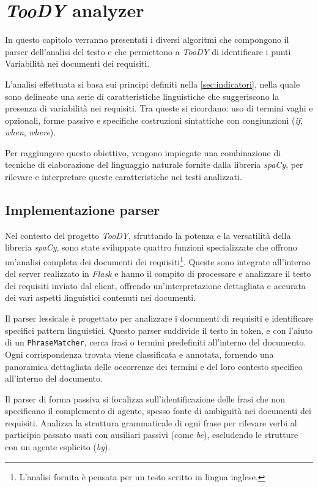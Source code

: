 \documentclass[12pt]{report}
\newcommand{\toody}{\textsl{TooDY}\xspace}
\newcommand{\flask}{\textsl{Flask}\xspace}
\newcommand{\spacy}{\textsl{spaCy}\xspace}
\begin{document}
\clearpage\thispagestyle{empty}
\null\newpage




\chapter{\toody analyzer}
\label{ch:parser}
In questo capitolo verranno presentati i diversi algoritmi che compongono il parser dell'analisi del testo e che permettono a \toody di identificare i punti Variabilità nei documenti dei requisiti.

L'analisi effettuata si basa sui principi definiti nella \cref{sec:indicatori}, nella quale sono delineate una serie di caratteristiche linguistiche che suggeriscono la presenza di variabilità nei requisiti. Tra queste si ricordano: uso di termini vaghi e opzionali, forme passive e specifiche costruzioni sintattiche con congiunzioni (\textit{if}, \textit{when}, \textit{where}).

Per raggiungere questo obiettivo, vengono impiegate una combinazione di tecniche di elaborazione del linguaggio naturale fornite dalla libreria \spacy, per rilevare e interpretare queste caratteristiche nei testi analizzati.


\section{Implementazione parser}
Nel contesto del progetto \toody, sfruttando la potenza e la versatilità della libreria \spacy, sono state sviluppate quattro funzioni specializzate che offrono un'analisi completa dei documenti dei requisiti\footnote{L'analisi fornita è pensata per un testo scritto in lingua inglese.}. Queste sono integrate all'interno del server realizzato in \flask e hanno il compito di processare e analizzare il testo dei requisiti inviato dal client, offrendo un'interpretazione dettagliata e accurata dei vari aspetti linguistici contenuti nei documenti.

Il \textsf{parser lessicale} è progettato per analizzare i documenti di requisiti e identificare specifici pattern linguistici. Questo parser suddivide il testo in token, e con l'aiuto di un \texttt{PhraseMatcher}, cerca frasi o termini predefiniti all'interno del documento. Ogni corrispondenza trovata viene classificata e annotata, fornendo una panoramica dettagliata delle occorrenze dei termini e del loro contesto specifico all'interno del documento.

Il \textsf{parser di forma passiva} si focalizza sull'identificazione delle frasi che non specificano il complemento di agente, spesso fonte di ambiguità nei documenti dei requisiti. Analizza la struttura grammaticale di ogni frase per rilevare verbi al participio passato usati con ausiliari passivi (come \textit{be}), escludendo le strutture con un agente esplicito (\textit{by}).
\end{document}
